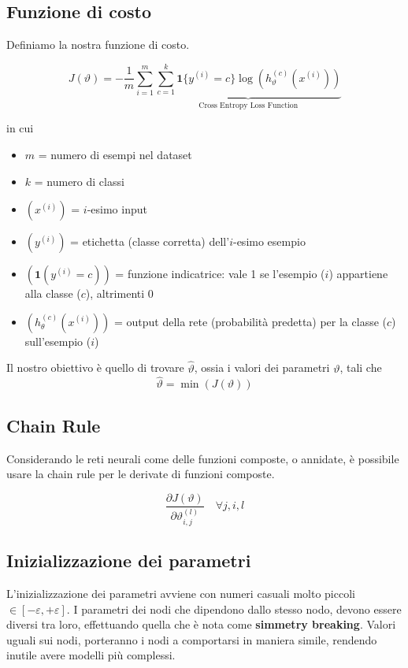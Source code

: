\subsection{Funzione di costo}
Definiamo la nostra funzione di costo.

$$
J(\vartheta) = -\frac{1}{m} \sum_{i=1}^{m} \underbrace{\sum_{c=1}^{k}\mathbf{1}\{y^{(i)} = c\} \log(h_\vartheta^{(c)}(x^{(i)}))}_\text{Cross Entropy Loss Function}
$$

\noindent 
in cui
\begin{itemize}
	\item $m$ = numero di esempi nel dataset
	\item $k$ = numero di classi
	\item $(x^{(i)})$ = $i$-esimo input
	\item $(y^{(i)})$ = etichetta (classe corretta) dell’$i$-esimo esempio
	\item $(\mathbf{1}(y^{(i)} = c))$ = funzione indicatrice: vale 1 se l’esempio ($i$) appartiene alla classe ($c$), altrimenti 0
	\item $(h_\theta^{(c)}(x^{(i)}))$ = output della rete (probabilità predetta) per la classe ($c$) sull’esempio ($i$)
\end{itemize}

\noindent
Il nostro obiettivo è quello di trovare $\hat{\vartheta}$, ossia i valori dei parametri $\vartheta$, tali che
$$
\hat\vartheta = \min(J(\vartheta))
$$


\subsection{Chain Rule}
Considerando le reti neurali come delle funzioni composte, o annidate, è possibile usare la chain rule per le derivate di funzioni composte.

$$
\frac{\partial J(\vartheta)}{\partial\vartheta_{i,j}^{(l)}} \quad \forall j, i, l
$$ 


\subsection{Inizializzazione dei parametri}
L'inizializzazione dei parametri avviene con numeri casuali molto piccoli $\in [-\varepsilon, +\varepsilon]$. I parametri dei nodi che dipendono dallo stesso nodo, devono essere diversi tra loro, effettuando quella che è nota come \textbf{simmetry breaking}. Valori uguali sui nodi, porteranno i nodi a comportarsi in maniera simile, rendendo inutile avere modelli più complessi.


